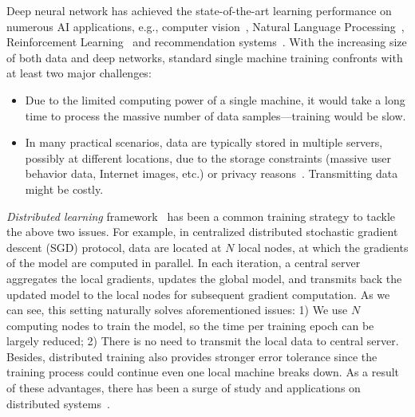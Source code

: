\documentclass[11pt]{article}
\begin{document}
Deep neural network has achieved the state-of-the-art learning performance on numerous AI applications, e.g., computer vision~\cite{Proc:GAN_NIPS14,Proc:Resnet_CVPR16,CV_review18}, Natural Language Processing~\cite{Proc:Graves_ICASSP13,NLP_review18,sentiment_review18}, Reinforcement Learning~\cite{Arxiv:MnihKSGAWR13,AlphaGo_17} and recommendation systems~\cite{Proc:Covington_2016,Article:Wei_2017}. With the increasing size of both data and deep networks, standard single machine training confronts with at least two major challenges:
\begin{itemize}
    \item Due to the limited computing power of a single machine, it would take a long time to process the massive number of data samples---training would be slow.
  
    \item In many practical scenarios, data are typically stored in multiple servers, possibly at different locations, due to the storage constraints (massive user behavior data, Internet images, etc.) or privacy reasons~\cite{Proc:Chang18}. Transmitting data might be costly.
\end{itemize}
\textit{Distributed learning} framework~\cite{Proc:Dean_NIPS12} has been a common training strategy to tackle the above two issues. For example, in centralized distributed stochastic gradient descent (SGD) protocol, data are located at $N$ local nodes, at which the gradients of the model are computed in parallel. In each iteration, a central server aggregates the local gradients, updates the global model, and transmits back the updated model to the local nodes for subsequent gradient computation. As we can see, this setting naturally solves aforementioned issues: 1) We use $N$ computing nodes to train the model, so the time per training epoch can be largely reduced; 2) There is no need to transmit the local data to central server. Besides, distributed training also provides stronger error tolerance since the training process could continue even one local machine breaks down. As a result of these advantages, there has been a surge of study and applications on distributed systems~\cite{boyd2011distributed,nedic2009distributed,duchi2011dual,Arxiv:Goyal17,hong2017prox,lu2019gnsd,koloskova2019decentralized}.
\end{document}
